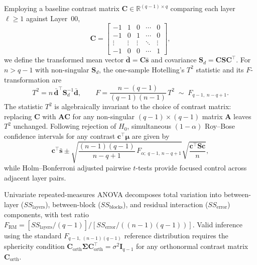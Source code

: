 \documentclass[12pt, a4paper, oneside]{report}
\theoremstyle{definition}
\newcommand{\vect}[1]{\mathbf{#1}}
\newcommand{\mat}[1]{\mathbf{#1}}
\newcommand{\R}{\mathbb{R}}
\begin{document}
Employing a baseline contrast matrix $\mat{C} \in \R^{(q-1) \times q}$ comparing each layer $\ell \ge 1$ against Layer~00,
\begin{equation}
    \mat{C} =
    \begin{bmatrix}
        -1 & 1 & 0 & \cdots & 0 \\
        -1 & 0 & 1 & \cdots & 0 \\
        \vdots & \vdots & \vdots & \ddots & \vdots \\
        -1 & 0 & 0 & \cdots & 1
    \end{bmatrix},
    \label{eq:contrast_matrix}
\end{equation}
we define the transformed mean vector $\bar{\vect{d}} = \mat{C}\bar{\vect{s}}$ and covariance $\mat{S}_d = \mat{C}\mat{S}\mat{C}^\top$. For $n > q - 1$ with non-singular $\mat{S}_d$, the one-sample Hotelling's $T^2$ statistic and its $F$-transformation are
\begin{equation}
    T^2 = n\,\bar{\vect{d}}^\top \mat{S}_d^{-1} \bar{\vect{d}},
    \qquad
    F = \frac{n - (q - 1)}{(q - 1)(n - 1)}\,T^2 \;\sim\; F_{q-1,\; n - q + 1}.
    \label{eq:hotelling_t2_profile}
\end{equation}
The statistic $T^2$ is algebraically invariant to the choice of contrast matrix: replacing $\mat{C}$ with $\mat{A}\mat{C}$ for any non-singular $(q-1) \times (q-1)$ matrix $\mat{A}$ leaves $T^2$ unchanged. Following rejection of $H_0$, simultaneous $(1 - \alpha)$ Roy--Bose confidence intervals for any contrast $\vect{c}^\top \boldsymbol{\mu}$ are given by
\begin{equation}
    \vect{c}^\top \bar{\vect{s}} \pm \sqrt{\frac{(n - 1)(q - 1)}{n - q + 1}\,F_{\alpha;\; q-1,\, n-q+1}} \sqrt{\frac{\vect{c}^\top \mat{S} \vect{c}}{n}},
    \label{eq:roy_bose_ci}
\end{equation}
while Holm--Bonferroni adjusted pairwise $t$-tests provide focused control across adjacent layer pairs.

Univariate repeated-measures ANOVA decomposes total variation into between-layer ($SS_{\text{layers}}$), between-block ($SS_{\text{blocks}}$), and residual interaction ($SS_{\text{error}}$) components, with test ratio $F_{\text{RM}} = [SS_{\text{layers}}/(q-1)] / [SS_{\text{error}}/((n-1)(q-1))]$. Valid inference using the standard $F_{q-1,\,(n-1)(q-1)}$ reference distribution requires the sphericity condition $\mat{C}_{\text{orth}}\mat{\Sigma}\mat{C}_{\text{orth}}^\top = \sigma^2 \mat{I}_{q-1}$ for any orthonormal contrast matrix $\mat{C}_{\text{orth}}$.
\end{document}
